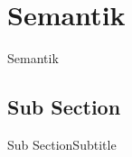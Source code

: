 \section{Semantik}
\begin{frame}{Semantik}

\end{frame}

\subsection{Sub Section}
\begin{frame}{Sub Section}{Subtitle}

\end{frame}